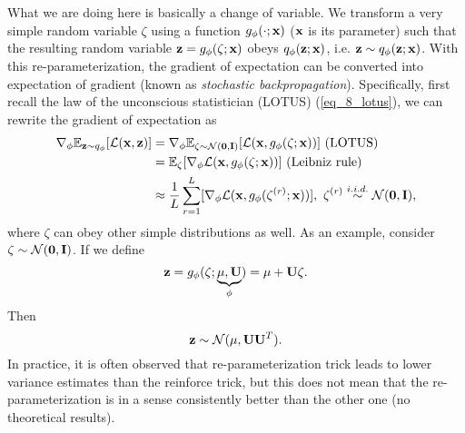 \documentclass[../main.tex]{subfiles}
\begin{document}
What we are doing here is basically a change of variable. We transform a very simple random variable $\zeta$ using a function $g_\phi(\cdot;{\bf x})$ (${\bf x}$ is its parameter) such that the resulting random variable ${\bf z}=g_\phi(\zeta;{\bf x})$ obeys $q_\phi({\bf z};{\bf x})$, i.e. ${\bf z}\sim q_\phi({\bf z};{\bf x})$. With this re-parameterization, the gradient of expectation can be converted into expectation of gradient (known as \emph{stochastic backpropagation}). Specifically, first recall the law of the unconscious statistician (LOTUS) (\ref{eq_8_lotus}), we can rewrite the gradient of expectation as
\begin{align*}
\nabla_\phi \mathbb{E}_{{\bf z}\sim q_\phi}[\mathcal{L}({\bf x,z})] &= \nabla_\phi \mathbb{E}_{\zeta\sim\mathcal{N}({\bf 0,I})} [\mathcal{L}({\bf x},g_\phi(\zeta;{\bf x}))]\ ({\rm LOTUS})\\
&=\mathbb{E}_{\zeta}[\nabla_\phi \mathcal{L}({\bf x},g_\phi(\zeta;{\bf x}))]\ (\text{Leibniz rule})\\
&\approx \frac{1}{L}\sum_{r=1}^{L}[\nabla_\phi \mathcal{L}({\bf x},g_\phi(\zeta^{(r)};{\bf x}))],\ \zeta^{(r)}\overset{i.i.d.}{\sim}\mathcal{N}({\bf 0,I}),
\end{align*}
where $\zeta$ can obey other simple distributions as well. As an example, consider $\zeta\sim\mathcal{N}({\bf 0,I})$. If we define
\begin{equation*}
{\bf z} = g_\phi(\zeta;\underbrace{\mu,{\bf U}}_{\phi})=\mu +{\bf U}\zeta.
\end{equation*}
Then
\begin{equation*}
{\bf z}\sim \mathcal{N}(\mu,{\bf UU}^T).
\end{equation*}
In practice, it is often observed that re-parameterization trick leads to lower variance estimates than the reinforce trick, but this does not mean that the re-parameterization is in a sense consistently better than the other one (no theoretical results).
\end{document}
